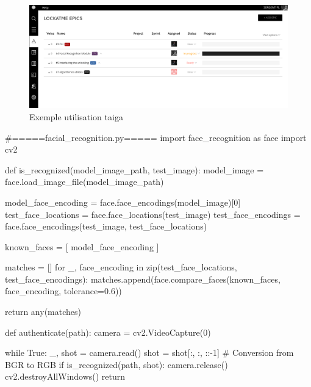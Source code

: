 \documentclass[french]{report}
\begin{document}
\begin{figure}[h]\label{fig:Taiga}
  \includegraphics[width=\linewidth]{taiga}
  \caption{Exemple utilisation taiga}
  \label{fig:Taiga}
\end{figure}

\newpage

\begin{python}
#=====facial_recognition.py=====
  import face_recognition as face
  import cv2


  def is_recognized(model_image_path, test_image):
      model_image = face.load_image_file(model_image_path)

      model_face_encoding = face.face_encodings(model_image)[0]
      test_face_locations = face.face_locations(test_image)
      test_face_encodings = face.face_encodings(test_image, test_face_locations)

      known_faces = [
          model_face_encoding
      ]

      matches = []
      for _, face_encoding in zip(test_face_locations, test_face_encodings):
          matches.append(face.compare_faces(known_faces, face_encoding, tolerance=0.6))

      return any(matches)


  def authenticate(path):
      camera = cv2.VideoCapture(0)

      while True:
          _, shot = camera.read()
          shot = shot[:, :, ::-1]  # Conversion from BGR to RGB
          if is_recognized(path, shot):
              camera.release()
              cv2.destroyAllWindows()
              return
\end{python}

\newpage
\end{document}
